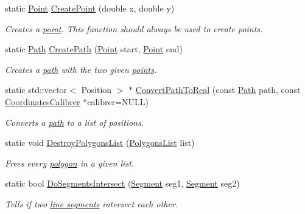 \begin{DoxyCompactItemize}
\item 
static \hyperlink{structPathFinder_1_1Point}{Point} \hyperlink{classPathFinder_a457592f3579bbe0c0527360c2c8a928a}{CreatePoint} (double x, double y)
\begin{DoxyCompactList}\small\item\em Creates a \hyperlink{structPathFinder_1_1Point}{point}. This function should always be used to create points. \item\end{DoxyCompactList}\item 
static \hyperlink{classPathFinder_a269aba09b7b3208092f67f2bc02cf63e}{Path} \hyperlink{classPathFinder_a42e557e3fe4cd1b209a4722ecfbf876b}{CreatePath} (\hyperlink{structPathFinder_1_1Point}{Point} start, \hyperlink{structPathFinder_1_1Point}{Point} end)
\begin{DoxyCompactList}\small\item\em Creates a \hyperlink{classPathFinder_a269aba09b7b3208092f67f2bc02cf63e}{path} with the two given \hyperlink{structPathFinder_1_1Point}{points}. \item\end{DoxyCompactList}\item 
static std::vector$<$ Position $>$ $\ast$ \hyperlink{classPathFinder_aba7f833c9bb8de011c62a1f01fb26144}{ConvertPathToReal} (const \hyperlink{classPathFinder_a269aba09b7b3208092f67f2bc02cf63e}{Path} path, const \hyperlink{classCoordinatesCalibrer}{CoordinatesCalibrer} $\ast$calibrer=NULL)
\begin{DoxyCompactList}\small\item\em Converts a \hyperlink{classPathFinder_a269aba09b7b3208092f67f2bc02cf63e}{path} to a list of positions. \item\end{DoxyCompactList}\item 
static void \hyperlink{classPathFinder_a3306e3d1bb0ae88e236eb7cabbfce835}{DestroyPolygonsList} (\hyperlink{classPathFinder_a16ed073fa542c82fd09e582cb4fbed24}{PolygonsList} list)
\begin{DoxyCompactList}\small\item\em Frees every \hyperlink{structPathFinder_1_1ConvexPolygon}{polygon} in a given list. \item\end{DoxyCompactList}\item 
static bool \hyperlink{classPathFinder_a87a4f6d236e4b386e8b727e465f802be}{DoSegmentsIntersect} (\hyperlink{structPathFinder_1_1Segment}{Segment} seg1, \hyperlink{structPathFinder_1_1Segment}{Segment} seg2)
\begin{DoxyCompactList}\small\item\em Tells if two \hyperlink{structPathFinder_1_1Segment}{line segments} intersect each other. \item\end{DoxyCompactList}\end{DoxyCompactItemize}
